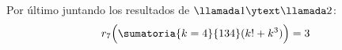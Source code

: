 Por último juntando los resultados de $\llamada1 \ytext \llamada2$:
$$
  r_7 \Big( \sumatoria{k = 4}{134} (k! + k^3) \Big)  = 3
$$

\begin{aportes}
  \item {}
  \item {}
\end{aportes}
